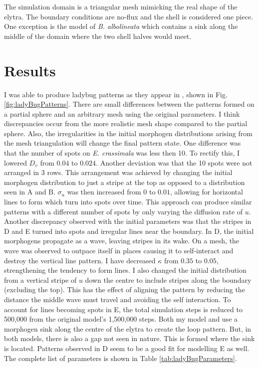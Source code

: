 The simulation domain is a triangular mesh mimicking the real shape of the elytra. The boundary conditions are no-flux and the shell is considered one piece. One exception is the model of  \textit{B. albolineata} which contains a sink along the middle of the domain where the two shell halves would meet. 

\section{Results}
I was able to produce ladybug patterns as they appear in \citep{liaw2001}, shown in Fig. \ref{fig:ladyBugPatterns}. There are small differences between the patterns formed on a partial sphere and an arbitrary mesh using the original parameters. I think discrepancies occur from the more realistic mesh shape compared to the partial sphere. Also, the irregularities in the initial morphogen distributions arising from the mesh triangulation will change the final pattern state. One difference was that the number of spots on \textit{E. crassimala} was less then 10. To rectify this, I lowered $D_v$ from $0.04$ to $0.024$. Another deviation was that the 10 spots were not arranged in 3 rows. This arrangement was achieved by changing the initial morphogen distribution to just a stripe at the top as opposed to a distribution seen in A and B. $\sigma_u$ was then increased from $0$ to $0.01$, allowing for horizontal lines to form which turn into spots over time. This approach can produce similar patterns  with a different number of spots by only varying the diffusion rate of $u$. Another discrepancy observed with the initial parameters was that the stripes in D and E turned into spots and irregular lines near the boundary. In D, the initial morphogens propagate as a wave, leaving stripes in its wake. On a mesh, the wave was observed to outpace itself in places causing it to self-interact and destroy the vertical line pattern. I have decreased $\kappa$ from $0.35$ to $0.05$, strengthening the tendency to form lines. I also changed the initial distribution from a vertical stripe of $u$ down the centre to include stripes along the boundary (excluding the top). This has the effect of aligning the pattern by reducing the distance the middle wave must travel and avoiding the self interaction. To account for lines becoming spots in E, the total simulation steps is reduced to 500,000 from the original model's 1,500,000 steps. Both my model and \citep{liaw2001} use a morphogen sink along the centre of the elytra to create the loop pattern. But, in both models, there is also a gap not seen in nature. This is formed where the sink is located. Patterns observed in D seem to be a good fit for modelling E as well. The complete list of parameters is shown in Table \ref{tab:ladyBugParameters}.

